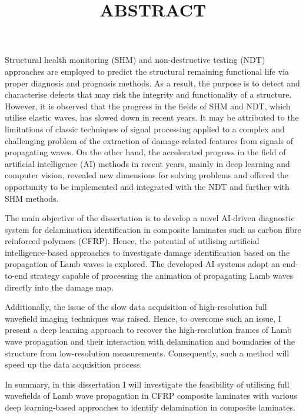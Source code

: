 \documentclass{article}
\title{ABSTRACT}
\date{}
\begin{document}
	\maketitle
	\justifying
		Structural health monitoring (SHM) and non-destructive testing (NDT) approaches are employed to predict the structural remaining functional life via proper diagnosis and prognosis methods.
	As a result, the purpose is to detect and characterise defects that may risk the integrity and functionality of a structure.
	However, it is observed that the progress in the fields of SHM and NDT, which utilise elastic waves, has slowed down in recent years.
	It may be attributed to the limitations of classic techniques of signal processing applied to a complex and challenging problem of the extraction of damage-related features from signals of propagating waves.
	On the other hand, the accelerated progress in the field of artificial intelligence (AI) methods in recent years, mainly in deep learning and computer vision, revealed new dimensions for solving problems and offered the opportunity to be implemented and integrated with the NDT and further with SHM methods.
	
	The main objective of the dissertation is to develop a novel AI-driven diagnos\-tic system for delamination identification in composite laminates such as carbon fibre reinforced polymers (CFRP).
	Hence, the potential of utilising artificial intelligence-based approaches to investigate damage identification based on the propagation of Lamb waves is explored.
	The developed AI systems adopt an end-to-end strategy capable of processing the animation of propagating Lamb waves directly into the damage map.
	
	Additionally, the issue of the slow data acquisition of high-resolution full wavefield imaging techniques was raised.
	Hence, to overcome such an issue, I present a deep learning approach to recover the high-resolution frames of Lamb wave propagation and their interaction with delamination and boundaries of the structure from low-resolution measurements.
	Consequently, such a method will speed up the data acquisition process.
	
	In summary, in this dissertation I will investigate the feasibility of utilising full wavefields of Lamb wave propagation in CFRP composite laminates with various deep learning-based approaches to identify delamination in composite laminates.
	
\end{document}
